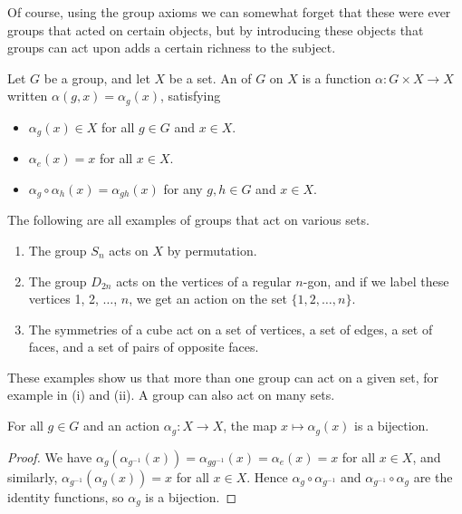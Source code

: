 Of course, using the group axioms we can somewhat forget that these were ever groups that acted on certain objects, but by introducing these objects that groups can act upon adds a certain richness to the subject.

\begin{definition}
Let $G$ be a group, and let $X$ be a set. An  of $G$ on $X$ is a function $\alpha : G \times X \rightarrow X$ written $\alpha(g, x) = \alpha_g(x)$, satisfying
\begin{itemize}
	\item $\alpha_g(x) \in X$ for all $g \in G$ and $x \in X$.
	\item $\alpha_e(x) = x$ for all $x \in X$.
	\item $\alpha_g \circ \alpha_h (x) = \alpha_{gh}(x)$ for any $g, h \in G$ and $x \in X$.
\end{itemize}
\end{definition}

\begin{example}
The following are all examples of groups that act on various sets.
\begin{enumerate}[label=(\roman*)]
	\item The group $S_n$ acts on $X$ by permutation.
	\item The group $D_{2n}$ acts on the vertices of a regular $n$-gon, and if we label these vertices 1, 2, $\dots$, $n$, we get an action on the set $\{1, 2, \dots, n\}$.
	\item The symmetries of a cube act on a set of vertices, a set of edges, a set of faces, and a set of pairs of opposite faces.
\end{enumerate}
\end{example}

\begin{remark}
	These examples show us that more than one group can act on a given set, for example in (i) and (ii). A group can also act on many sets.
\end{remark}

\begin{lemma}\label{lemma:bijection}
	For all $g \in G$ and an action $\alpha_g: X \rightarrow X$, the map $x \mapsto \alpha_g(x)$ is a bijection.
\end{lemma}
\begin{proof}
	We have $\alpha_g(\alpha_{g^{-1}}(x)) = \alpha_{g g^{-1}}(x) = \alpha_e(x) = x$ for all $x \in X$, and similarly, $\alpha_{g^{-1}}(\alpha_g(x)) = x$ for all $x \in X$. Hence $\alpha_g \circ \alpha_{g^{-1}}$ and $\alpha_{g^{-1}} \circ \alpha_{g}$ are the identity functions, so $\alpha_g$ is a bijection.
\end{proof}

